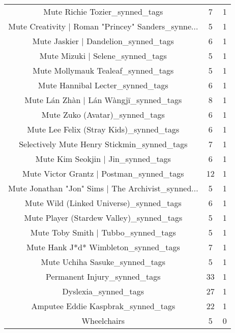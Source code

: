 \begin{table}[h!]
{\begin{tabular}{|c|c|c|}
                    Mute Richie Tozier\_synned\_tags &           7 &          1 \\
Mute Creativity | Roman "Princey" Sanders\_synne... &           5 &          1 \\
              Mute Jaskier | Dandelion\_synned\_tags &           6 &          1 \\
                  Mute Mizuki | Selene\_synned\_tags &           5 &          1 \\
                Mute Mollymauk Tealeaf\_synned\_tags &           5 &          1 \\
                  Mute Hannibal Lecter\_synned\_tags &           6 &          1 \\
            Mute Lán Zhàn | Lán Wàngjī\_synned\_tags &           8 &          1 \\
                    Mute Zuko (Avatar)\_synned\_tags &           6 &          1 \\
           Mute Lee Felix (Stray Kids)\_synned\_tags &           6 &          1 \\
       Selectively Mute Henry Stickmin\_synned\_tags &           7 &          1 \\
                Mute Kim Seokjin | Jin\_synned\_tags &           6 &          1 \\
          Mute Victor Grantz | Postman\_synned\_tags &          12 &          1 \\
Mute Jonathan "Jon" Sims | The Archivist\_synned... &           5 &          1 \\
           Mute Wild (Linked Universe)\_synned\_tags &           6 &          1 \\
          Mute Player (Stardew Valley)\_synned\_tags &           5 &          1 \\
               Mute Toby Smith | Tubbo\_synned\_tags &           5 &          1 \\
              Mute Hank J*d* Wimbleton\_synned\_tags &           7 &          1 \\
                    Mute Uchiha Sasuke\_synned\_tags &           5 &          1 \\
                      Permanent Injury\_synned\_tags &          33 &          1 \\
                              Dyslexia\_synned\_tags &          27 &          1 \\
                Amputee Eddie Kaspbrak\_synned\_tags &          22 &          1 \\
                                       Wheelchairs &           5 &          0 \\

\end{tabular}}
\end{table}

